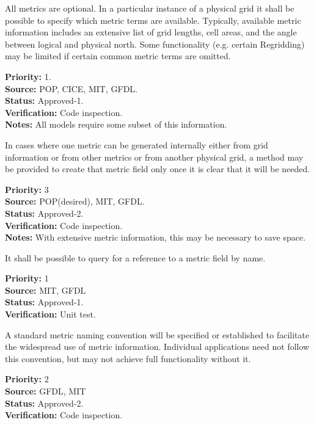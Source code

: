 All metrics are optional.  In a particular instance of a physical grid it shall be
possible to specify which metric terms are available.  Typically, available
metric information includes an extensive list of grid lengths, cell areas, and
the angle between logical and physical north.  Some functionality (e.g. certain
Regridding) may be limited if certain common metric terms are omitted.
\begin{reqlist}
{\bf Priority:} 1. \\
{\bf Source:} POP, CICE, MIT, GFDL. \\
{\bf Status:} Approved-1. \\
{\bf Verification:} Code inspection. \\
{\bf Notes:} All models require some subset of this information.
\end{reqlist}

In cases where one metric can be generated internally either from grid information
or from other metrics or from another physical grid, a method may be provided to create
that metric field only once it is clear that it will be needed.
\begin{reqlist}
{\bf Priority:} 3 \\
{\bf Source:} POP(desired), MIT, GFDL. \\
{\bf Status:} Approved-2. \\
{\bf Verification:} Code inspection. \\
{\bf Notes:} With extensive metric information, this may be necessary to save space.
\end{reqlist}

It shall be possible to query for a reference to a metric field by name.
\begin{reqlist}
{\bf Priority:} 1 \\
{\bf Source:} MIT, GFDL \\
{\bf Status:} Approved-1. \\
{\bf Verification:} Unit test.
\end{reqlist}

A standard metric naming convention will be specified or established to facilitate
the widespread use of metric information.  Individual applications need not
follow this convention, but may not achieve full functionality without it.
\begin{reqlist}
{\bf Priority:} 2 \\
{\bf Source:} GFDL, MIT \\
{\bf Status:} Approved-2. \\
{\bf Verification:} Code inspection.
\end{reqlist}

